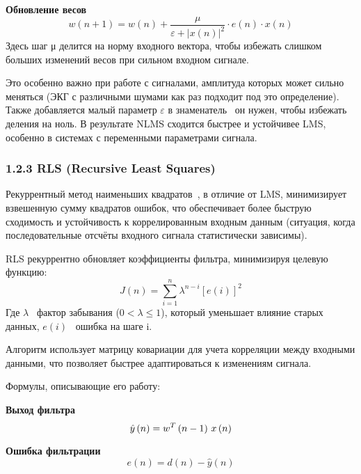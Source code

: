 \documentclass[10pt,a5paper]{article}
\numberwithin{figure}{section}
\numberwithin{table}{section}
\begin{document}
\textbf{Обновление весов}
\begin{equation*}
  w\left(n+1\right)=w\left(n\right)+\frac{\mu}{\varepsilon+|x\left(n\right)|^2}\cdot e\left(n\right)\cdot x\left(n\right)
\end{equation*}
\noindent
Здесь шаг μ делится на норму входного вектора, чтобы избежать слишком больших изменений весов при сильном входном сигнале.

Это особенно важно при работе с сигналами, амплитуда которых может сильно меняться (ЭКГ с различными шумами как раз подходит под это определение). Также добавляется малый параметр $\varepsilon$ в знаменатель \textendash\ он нужен, чтобы избежать деления на ноль.
В результате NLMS сходится быстрее и устойчивее LMS, особенно в системах с переменными параметрами сигнала.

\subsubsection{1.2.3 RLS (Recursive Least Squares)}
Рекуррентный метод наименьших квадратов~\cite{dhas2022}, в отличие от LMS, минимизирует взвешенную сумму квадратов ошибок, что обеспечивает более быструю сходимость и устойчивость к коррелированным входным данным (ситуация, когда последовательные отсчёты входного сигнала статистически зависимы).

RLS рекуррентно обновляет коэффициенты фильтра, минимизируя целевую функцию:
\begin{equation*}
  J\left(n\right)=\sum_{i=1}^{n}{\lambda^{n-i}\left[e\left(i\right)\right]^2}
\end{equation*}
\noindent
Где 	$\lambda$ \textendash\ фактор забывания ($0<\lambda\le1$), который уменьшает влияние старых данных, 	$e\left(i\right)$  \textendash\ ошибка на шаге i.

Алгоритм использует матрицу ковариации для учета корреляции между входными данными, что позволяет быстрее адаптироваться к изменениям сигнала.

Формулы, описывающие его работу:

\textbf{Выход фильтра}
\begin{equation*}
  \hat{y}\left(n\right)=w^T\left(n-1\right)\thinspace x\left(n\right)
\end{equation*}

\textbf{Ошибка фильтрации}
\begin{equation*}
  e\left(n\right)=d\left(n\right)-\hat{y}\left(n\right)
\end{equation*}
\end{document}
